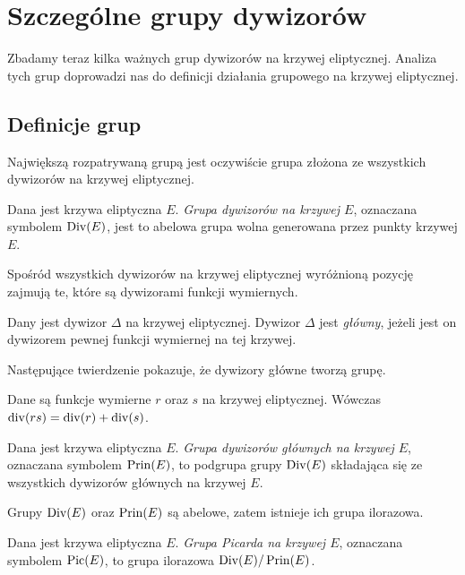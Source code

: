 \section{Szczególne grupy dywizorów}

\noindent
Zbadamy teraz kilka ważnych grup dywizorów na krzywej eliptycznej.
Analiza tych grup doprowadzi nas do definicji
działania grupowego na krzywej eliptycznej.

\subsection*{Definicje grup}

\noindent
Największą rozpatrywaną grupą jest oczywiście
grupa złożona ze wszystkich dywizorów na krzywej eliptycznej.

\begin{definition}
Dana jest krzywa eliptyczna $E$.
\emph{Grupa dywizorów na krzywej $E$},
oznaczana symbolem $\operatorname{Div}(E)$,
jest to abelowa grupa wolna generowana przez punkty krzywej $E$.
\end{definition}

\noindent
Spośród wszystkich dywizorów na krzywej eliptycznej
wyróżnioną pozycję zajmują te,
które są dywizorami funkcji wymiernych.

\begin{definition}
Dany jest dywizor $\Delta$ na krzywej eliptycznej.
Dywizor $\Delta$ jest \emph{główny},
jeżeli jest on dywizorem pewnej funkcji wymiernej na tej krzywej.
\end{definition}

\noindent
Następujące twierdzenie pokazuje, że dywizory główne tworzą grupę.

\begin{theorem}\label{fun_mul_divi_add_theorem}
Dane są funkcje wymierne $r$ oraz $s$ na krzywej eliptycznej.
Wówczas $\operatorname{div}(rs) = \operatorname{div}(r) + \operatorname{div}(s)$.
\end{theorem}

\begin{definition}
Dana jest krzywa eliptyczna $E$.
\emph{Grupa dywizorów głównych na krzywej $E$},
oznaczana symbolem $\operatorname{Prin}(E)$,
to podgrupa grupy $\operatorname{Div}(E)$
składająca się ze wszystkich dywizorów głównych na krzywej $E$.
\end{definition}

\noindent
Grupy $\operatorname{Div}(E)$ oraz $\operatorname{Prin}(E)$ są abelowe,
zatem istnieje ich grupa ilorazowa.

\begin{definition}
Dana jest krzywa eliptyczna $E$.
\emph{Grupa Picarda na krzywej $E$},
oznaczana symbolem $\operatorname{Pic}(E)$,
to grupa ilorazowa $\operatorname{Div}(E)/\operatorname{Prin}(E)$.
\end{definition}

